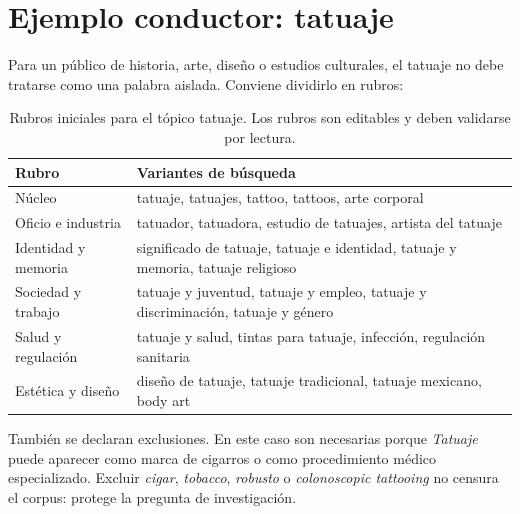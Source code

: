 \documentclass[11pt]{article}
\begin{document}
\section{Ejemplo conductor: tatuaje}

Para un público de historia, arte, diseño o estudios culturales, el tatuaje no
debe tratarse como una palabra aislada. Conviene dividirlo en rubros:

\begin{table}[H]
\centering
\small
\begin{tabular}{L{0.24\textwidth}L{0.62\textwidth}}
\toprule
\textbf{Rubro} & \textbf{Variantes de búsqueda} \\
\midrule
Núcleo & tatuaje, tatuajes, tattoo, tattoos, arte corporal \\
Oficio e industria & tatuador, tatuadora, estudio de tatuajes, artista del tatuaje \\
Identidad y memoria & significado de tatuaje, tatuaje e identidad, tatuaje y memoria, tatuaje religioso \\
Sociedad y trabajo & tatuaje y juventud, tatuaje y empleo, tatuaje y discriminación, tatuaje y género \\
Salud y regulación & tatuaje y salud, tintas para tatuaje, infección, regulación sanitaria \\
Estética y diseño & diseño de tatuaje, tatuaje tradicional, tatuaje mexicano, body art \\
\bottomrule
\end{tabular}
\caption{Rubros iniciales para el tópico tatuaje. Los rubros son editables y deben validarse por lectura.}
\label{tab:tatuaje-rubros-es}
\end{table}

También se declaran exclusiones. En este caso son necesarias porque
\textit{Tatuaje} puede aparecer como marca de cigarros o como procedimiento
médico especializado. Excluir \textit{cigar}, \textit{tobacco}, \textit{robusto}
o \textit{colonoscopic tattooing} no censura el corpus: protege la pregunta de
investigación.
\end{document}
